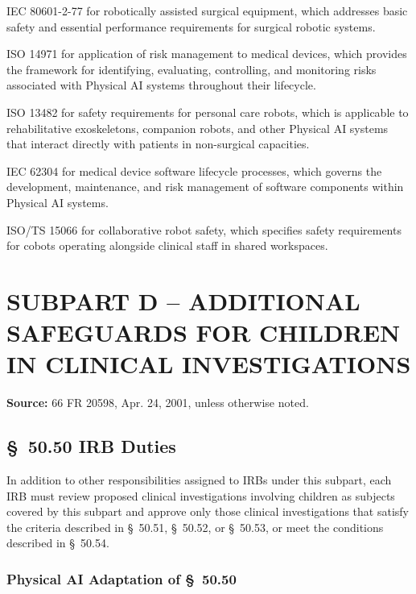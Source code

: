 \begin{description}[leftmargin=1.0cm,style=sameline]
\item[(1)] IEC 80601-2-77 for robotically assisted surgical equipment, which addresses basic safety and essential performance requirements for surgical robotic systems.
\item[(2)] ISO 14971 for application of risk management to medical devices, which provides the framework for identifying, evaluating, controlling, and monitoring risks associated with Physical AI systems throughout their lifecycle.
\item[(3)] ISO 13482 for safety requirements for personal care robots, which is applicable to rehabilitative exoskeletons, companion robots, and other Physical AI systems that interact directly with patients in non-surgical capacities.
\item[(4)] IEC 62304 for medical device software lifecycle processes, which governs the development, maintenance, and risk management of software components within Physical AI systems.
\item[(5)] ISO/TS 15066 for collaborative robot safety, which specifies safety requirements for cobots operating alongside clinical staff in shared workspaces.
\end{description}

\section{SUBPART D -- ADDITIONAL SAFEGUARDS FOR CHILDREN IN CLINICAL INVESTIGATIONS}

\textbf{Source:} 66 FR 20598, Apr. 24, 2001, unless otherwise noted.

\subsection{\S~50.50 IRB Duties}

In addition to other responsibilities assigned to IRBs under this subpart, each IRB must review proposed clinical investigations involving children as subjects covered by this subpart and approve only those clinical investigations that satisfy the criteria described in \S~50.51, \S~50.52, or \S~50.53, or meet the conditions described in \S~50.54.

\subsubsection{Physical AI Adaptation of \S~50.50}

